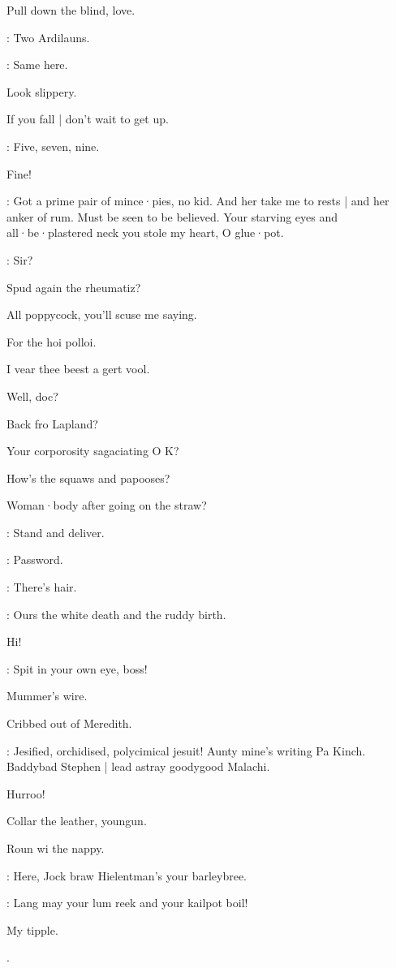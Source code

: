 Pull down the blind,
love.

\madden:
Two Ardilauns.

\lynch:
Same here.

Look slippery.

If you fall |
don't wait to get up.

\barman:
Five,
seven,
nine.

Fine!

\dixon:
Got a prime pair of mince·pies,
no kid.
And her take me to rests |
and her anker of rum.
Must be seen to be believed.
Your starving eyes and all·be·plastered neck you stole my heart,
O glue·pot.

\barman:
Sir?

Spud again the rheumatiz?

All poppycock,
you'll scuse me saying.

For the hoi polloi.

I vear thee beest a gert vool.

Well,
doc?

Back fro Lapland?

Your corporosity sagaciating O K?

How's the squaws and papooses?

Woman·body after going on the straw?

\lenehan:
Stand and deliver.

\crotthers:
Password.

\punch:
There's hair.

\Bloom:
Ours the white death and the ruddy birth.

Hi!

\bannon:
Spit in your own eye,
boss!

Mummer's wire.

Cribbed out of Meredith.

\mulligan:
Jesified,
orchidised,
polycimical jesuit!
Aunty mine's writing Pa Kinch.
Baddybad Stephen |
lead astray goodygood Malachi.


Hurroo!

Collar the leather,
youngun.

Roun wi the nappy.

\lenehan:
Here,
Jock braw Hielentman's your barleybree.

\crotthers:
Lang may your lum reek and your kailpot boil!

My tipple.

.


